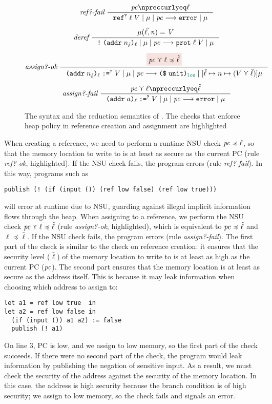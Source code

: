{\begin{figure}[tbp]
{\begin{gather*}
  \\[1ex]
  \textit{ref?-fail}~
  \inference
  {\pc \npreccurlyeq \ell}
  {\reduce{\dynref{?}{\ell}{V}}{\mu}{\pc}{\key{error}}{\mu}}
  \\[1ex]
  \textit{deref}~
  \inference
  {\mathit{\mu(\hat{\ell},n) = V}}
  {\reduce{\dynderef{\dynaddr{n_{\hat{\ell}}}{\ell}}}{\mu}{\pc}{\dynprot{\ell}{V}}{\mu}}
  \\[1ex]
  \textit{assign?-ok}~
  \inference
  {\highlightred{\pc \curlyvee \ell \preccurlyeq \hat{\ell}}}
  {\reduce{\dynassign{\dynaddr{n_{\hat{\ell}}}{\ell}}{?}{V}}{\mu}{\pc}{\dynconst{\unit}{\low}}{[\hat{\ell} \mapsto n \mapsto (V \curlyvee \hat{\ell})] \mu}}
  \\[1ex]
  \textit{assign?-fail}~
  \inference
  {\pc \curlyvee \ell \npreccurlyeq \hat{\ell}}
  {\reduce{\dynassign{\dynaddr{a}{\ell}}{?}{V}}{\mu}{\pc}{\key{error}}{\mu}}
  \end{gather*}}
  \caption{The syntax and the reduction semantics of \DynIFC. The checks that
    enforce heap policy in reference creation and assignment are highlighted}
  \label{fig:dyn-ifc}
\end{figure}

When creating a reference, we need to perform a runtime NSU check $\mathit{pc}
\preccurlyeq \ell$, so that the memory location to write to is at least as
secure as the current PC (rule \textit{ref?-ok}, highlighted). If the NSU check
fails, the program errors (rule \textit{ref?-fail}). In this way, programs such
as
\begin{lstlisting}[style=tt,numbers=none]
publish (! (if (input ()) (ref low false) (ref low true)))
\end{lstlisting}
will error at runtime due to NSU, guarding against illegal implicit information
flows through the heap. When assigning to a reference, we perform the NSU check
$\mathit{pc} \curlyvee \ell \preccurlyeq \hat{\ell}$ (rule \textit{assign?-ok},
highlighted), which is equivalent to $\mathit{pc} \preccurlyeq \hat{\ell}$ and $\ell
\preccurlyeq \hat{\ell}$. If the NSU check fails, the program errors (rule
\textit{assign?-fail}). The first part of the check is similar to the check on
reference creation: it ensures that the security level ($\hat{\ell}$) of the
memory location to write to is at least as high as the current PC ($\mathit{pc}$). The
second part ensures that the memory location is at least as secure as the
address itself. This is because it may leak information when choosing which
address to assign to:
\begin{lstlisting}[style=tt]
let a1 = ref low true  in
let a2 = ref low false in
  (if (input ()) a1 a2) := false
  publish (! a1)
\end{lstlisting}
\noindent On line 3, PC is low, and we assign to low memory, so the first part of the
check succeeds. If there were no second part of the check, the program would
leak information by publishing the negation of sensitive input. As a result, we
must check the security of the address against the security of the memory
location. In this case, the address is high security because the branch
condition is of high security; we assign to low memory, so the check fails and
signals an error.

}

